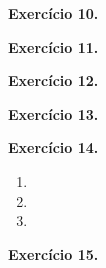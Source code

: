 \documentclass[12pt,a4paper]{article}
\begin{document}
\vspace{0.5cm}
\noindent\textbf{Exercício 10.}

\vspace{0.5cm}
\noindent\textbf{Exercício 11.}

\vspace{0.5cm}
\noindent\textbf{Exercício 12.}

\vspace{0.5cm}
\noindent\textbf{Exercício 13.}

\vspace{0.5cm}
\noindent\textbf{Exercício 14.}
\begin{enumerate}
    \renewcommand{\theenumi}{\alph{enumi}}
    \renewcommand{\labelenumi}{\theenumi)}
    \item 
    \item 
    \item 
\end{enumerate}

\vspace{0.5cm}
\noindent\textbf{Exercício 15.}
\end{document}
